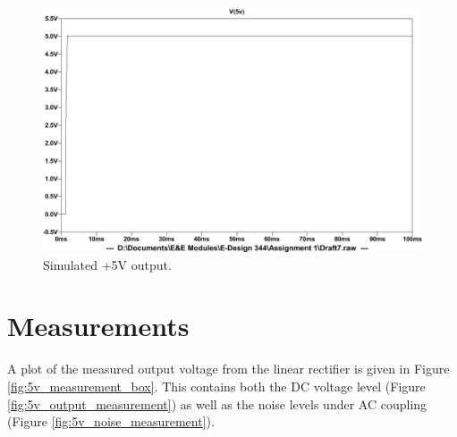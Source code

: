 \begin{figure}[h] 
 \centering
  	\includegraphics[width=0.7\linewidth]{./Figures/linear_simulate.pdf}
  	\caption{Simulated +5V output.}
  	\label{fig:+5v_simulation}
 \end{figure}
 
 
\section{Measurements} \label{sec:measurements_linear}
A plot of the measured output voltage from the linear rectifier is given in Figure \ref{fig:5v_measurement_box}. This contains both the DC voltage level (Figure \ref{fig:5v_output_measurement}) as well as the noise levels under AC coupling (Figure \ref{fig:5v_noise_measurement}).

